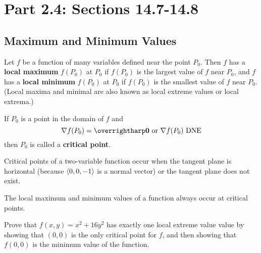 \documentclass[letterpaper, twoside, 12pt]{book}
\begin{document}
\setcounter{chapter}{1}

\chapter{Part 2.4: Sections 14.7-14.8}

\setcounter{chapter}{14}
\setcounter{section}{6}

\section{Maximum and Minimum Values} %

\begin{definition}
  Let $f$ be a function of many variables defined near the point $P_0$.
  Then $f$ has a \textbf{local maximum} $f(P_0)$ at $P_0$ if $f(P_0)$ is the
  largest value of $f$ near $P_0$, and
  $f$ has a \textbf{local minimum} $f(P_0)$ at $P_0$ if $f(P_0)$ is the smallest
  value of $f$ near $P_0$.
  (Local maxima and minimal are also known as local extreme values or
  local extrema.)
\end{definition}

\begin{definition}
  If $P_0$ is a point in the domain of $f$ and
    \[
      \nabla f(P_0) = \vect{0} \text{ or } \nabla f(P_0) \text{ DNE}
    \]
  then $P_0$ is called a \textbf{critical point}.
\end{definition}

\begin{theorem}
  Critical points of a two-variable function occur when the tangent plane
  is horizontal (because $\langle0,0,-1\rangle$ is a normal vector)
  or the tangent plane does not exist.
\end{theorem}

\begin{theorem}
  The local maximum and minimum values of a function always
  occur at critical points.
\end{theorem}

          \begin{problem}
            Prove that $f(x,y)=x^2+16y^2$ has exactly one local extreme value
            value by showing that $(0,0)$ is the only critical point
            for $f$, and then showing that $f(0,0)$ is the minimum value
            of the function.
          \end{problem}

          \begin{solution}

          \end{solution}
\end{document}
